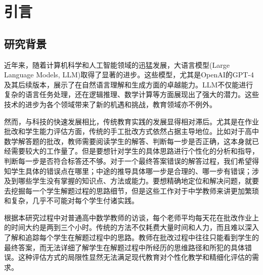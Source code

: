
\chapter{引言}


\section{研究背景}

近年来，随着计算机科学和人工智能领域的迅猛发展，大语言模型(Large Language Models, LLM)取得了显著的进步。这些模型，尤其是OpenAI的GPT-4及其后续版本，展示了在自然语言理解和生成方面的卓越能力。LLM不仅能进行复杂的语言任务处理，还在逻辑推理、数学计算等方面展现出了强大的潜力。这些技术的进步为各个领域带来了新的机遇和挑战，教育领域亦不例外。

然而，与科技的快速发展相比，传统教育实践的发展显得相对滞后。尤其是在作业批改和学生能力评估方面，传统的手工批改方式依然占据主导地位。比如对于高中数学解答题的批改，教师需要阅读学生的解答、判断每一步是否正确，这本身就已经需要较大的工作量了。但是要想针对学生的具体思路进行个性化的分析和指导，判断每一步是否符合标答还不够。对于一个最终答案错误的解答过程，我们希望得知学生具体的错误点在哪里；中途的推导具体哪一步是合理的、哪一步有错误；涉及到哪些学生没有掌握的知识点、方法或能力。要想精确地定位和解决问题，就要去挖掘每一个学生解题过程的思路细节，但是这些工作对于中学教师来讲更加繁琐和复杂，几乎不可能对每个学生付诸实践。

根据本研究过程中对普通高中数学教师的访谈，每个老师平均每天花在批改作业上的时间大约是两到三个小时。传统的方法不仅耗费大量时间和人力，而且难以深入了解和追踪每个学生在解题过程中的思路。教师在批改过程中往往只能看到学生的最终答案，而无法详细了解学生在解题过程中所经历的思维路径和所犯的具体错误。这种评估方式的局限性显然无法满足现代教育对个性化教学和精细化评估的需求。

